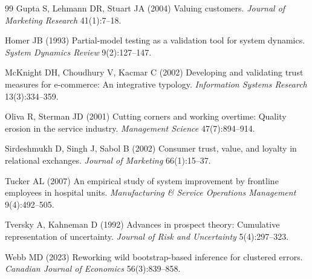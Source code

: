 \documentclass[msom,dblanonrev]{informs4}
\begin{document}
{\begin{thebibliography}{99}
Gupta S, Lehmann DR, Stuart JA (2004) Valuing customers.
\textit{Journal of Marketing Research} 41(1):7--18.

Homer JB (1993) Partial-model testing as a validation tool for system dynamics.
\textit{System Dynamics Review} 9(2):127--147.

McKnight DH, Choudhury V, Kacmar C (2002) Developing and validating trust measures for e-commerce: An integrative typology.
\textit{Information Systems Research} 13(3):334--359.

Oliva R, Sterman JD (2001) Cutting corners and working overtime: Quality erosion in the service industry.
\textit{Management Science} 47(7):894--914.

Sirdeshmukh D, Singh J, Sabol B (2002) Consumer trust, value, and loyalty in relational exchanges.
\textit{Journal of Marketing} 66(1):15--37.

Tucker AL (2007) An empirical study of system improvement by frontline employees in hospital units.
\textit{Manufacturing \& Service Operations Management} 9(4):492--505.

Tversky A, Kahneman D (1992) Advances in prospect theory: Cumulative representation of uncertainty.
\textit{Journal of Risk and Uncertainty} 5(4):297--323.

Webb MD (2023) Reworking wild bootstrap-based inference for clustered errors.
\textit{Canadian Journal of Economics} 56(3):839--858.

\end{thebibliography}
}%
\end{document}
